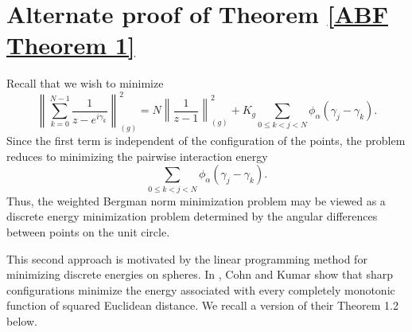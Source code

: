 \documentclass{article}
\begin{document}




\section{Alternate proof of Theorem \ref{ABF Theorem 1}}


Recall that we wish to minimize
\[
\left\|
\sum_{k=0}^{N-1}\frac{1}{z-e^{i\gamma_k}}
\right\|_{(g)}^2
=
N\left\|\frac{1}{z-1}\right\|_{(g)}^2
+
K_g
\sum_{0\leq k<j<N}
\phi_\alpha(\gamma_j-\gamma_k).
\]
Since the first term is independent of the configuration of the points, the problem reduces to minimizing the pairwise interaction energy
\[
\sum_{0\leq k<j<N}
\phi_\alpha(\gamma_j-\gamma_k).
\]
Thus, the weighted Bergman norm minimization problem may be viewed as a discrete energy minimization problem determined by the angular differences between points on the unit circle.

This second approach is motivated by the linear programming method for minimizing discrete energies on spheres. In \cite{cohnKumar2007}, Cohn and Kumar show that sharp configurations minimize the energy associated with every completely monotonic function of squared Euclidean distance. We recall a version of their Theorem 1.2 below. 



\end{document}
